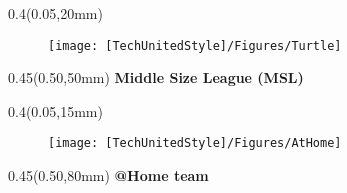\documentclass[aspectratio=43]{beamer}
\newcommand{\TULeftMargin}{0.05\paperwidth}
\newcommand{\TULeftWidth}{0.4\paperwidth}
\newcommand{\TURightMargin}{0.50\paperwidth}
\newcommand{\TURightWidth}{0.45\paperwidth}
\begin{document}
	
	\begin{frame}
	
		\begin{textblock*}{\TULeftWidth}(\TULeftMargin,20mm)
			\begin{figure}
				\centering				\texttt{[image: [TechUnitedStyle]/Figures/Turtle]}
			\end{figure}
		\end{textblock*}
		
		\begin{textblock*}{\TURightWidth}(\TURightMargin,50mm)
			\textbf{Middle Size League (MSL)}
	\end{textblock*}
	
	\end{frame}


	\begin{frame}
	
		\begin{textblock*}{\TULeftWidth}(\TULeftMargin,15mm)
			\begin{figure}
				\centering			\texttt{[image: [TechUnitedStyle]/Figures/AtHome]}
			\end{figure}
		\end{textblock*}
		
		\begin{textblock*}{\TURightWidth}(\TURightMargin,80mm)
			\Large\textbf{ @Home team}
	\end{textblock*}
	
	\end{frame}
\end{document}

